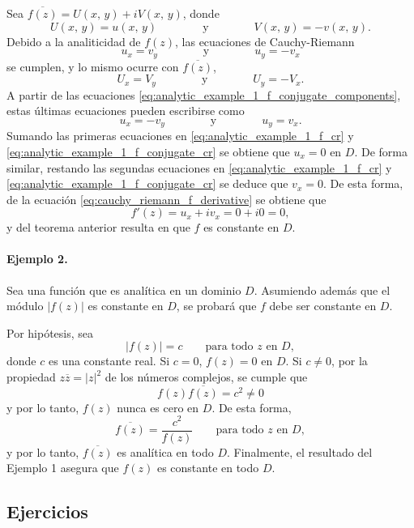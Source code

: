 \documentclass[a4paper]{report}
\begin{document}
Sea \(\overline{f(z)}=U(x,\,y)+iV(x,\,y)\), donde
\begin{equation}\label{eq:analytic_example_1_f_conjugate_components}
 U(x,\,y)=u(x,\,y)
 \qquad\qquad\textrm{y}\qquad\qquad
 V(x,\,y)=-v(x,\,y). 
\end{equation}
Debido a la analiticidad de \(f(z)\), las ecuaciones de Cauchy-Riemann 
\begin{equation}\label{eq:analytic_example_1_f_cr}
 u_x=v_y
 \qquad\qquad\textrm{y}\qquad\qquad
 u_y=-v_x
\end{equation}
se cumplen, y lo mismo ocurre con \(\overline{f(z)}\),
\[
 U_x=V_y
 \qquad\qquad\textrm{y}\qquad\qquad
 U_y=-V_x.
\]
A partir de las ecuaciones \ref{eq:analytic_example_1_f_conjugate_components}, estas últimas ecuaciones pueden escribirse como
\begin{equation}\label{eq:analytic_example_1_f_conjugate_cr}
 u_x=-v_y
 \qquad\qquad\textrm{y}\qquad\qquad
 u_y=v_x .
\end{equation}
Sumando las primeras ecuaciones en \ref{eq:analytic_example_1_f_cr} y \ref{eq:analytic_example_1_f_conjugate_cr} se obtiene que \(u_x=0\) en \(D\). De forma similar, restando las segundas ecuaciones en \ref{eq:analytic_example_1_f_cr} y \ref{eq:analytic_example_1_f_conjugate_cr} se deduce que \(v_x=0\). De esta forma, de la ecuación \ref{eq:cauchy_riemann_f_derivative} se obtiene que 
\[
 f'(z)=u_x+iv_x=0+i0=0,
\]
y del teorema anterior resulta en que \(f\) es constante en \(D\).

\paragraph{Ejemplo 2.} Sea una función que es analítica en un dominio \(D\). Asumiendo además que el módulo \(|f(z)|\) es constante en \(D\), se probará que \(f\) debe ser constante en \(D\).

Por hipótesis, sea
\[
 |f(z)|=c\qquad\textrm{para todo }z\textrm{ en }D,
\]
donde \(c\) es una constante real. Si \(c=0\), \(f(z)=0\) en \(D\). Si \(c\neq0\), por la propiedad \(z\overline{z}=|z|^2\) de los números complejos, se cumple que 
\[
 f(z)\overline{f(z)}=c^2\neq0
\]
y por lo tanto, \(f(z)\) nunca es cero en \(D\). De esta forma,
\[
 \overline{f(z)}=\frac{c^2}{f(z)}\qquad\textrm{para todo }z\textrm{ en }D,
\]
y por lo tanto, \(\overline{f(z)}\) es analítica en todo \(D\). Finalmente, el resultado del Ejemplo 1 asegura que \(f(z)\) es constante en todo \(D\).

\subsection{Ejercicios}
\end{document}
